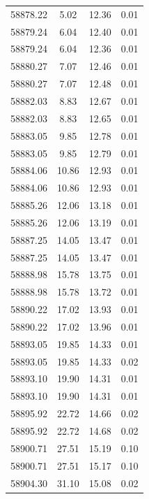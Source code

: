 \begin{longtable}{|c|c|c|c|}
 58878.22 &    5.02 &       12.36 &          0.01 \\
 58879.24 &    6.04 &       12.40 &          0.01 \\
 58879.24 &    6.04 &       12.36 &          0.01 \\
 58880.27 &    7.07 &       12.46 &          0.01 \\
 58880.27 &    7.07 &       12.48 &          0.01 \\
 58882.03 &    8.83 &       12.67 &          0.01 \\
 58882.03 &    8.83 &       12.65 &          0.01 \\
 58883.05 &    9.85 &       12.78 &          0.01 \\
 58883.05 &    9.85 &       12.79 &          0.01 \\
 58884.06 &   10.86 &       12.93 &          0.01 \\
 58884.06 &   10.86 &       12.93 &          0.01 \\
 58885.26 &   12.06 &       13.18 &          0.01 \\
 58885.26 &   12.06 &       13.19 &          0.01 \\
 58887.25 &   14.05 &       13.47 &          0.01 \\
 58887.25 &   14.05 &       13.47 &          0.01 \\
 58888.98 &   15.78 &       13.75 &          0.01 \\
 58888.98 &   15.78 &       13.72 &          0.01 \\
 58890.22 &   17.02 &       13.93 &          0.01 \\
 58890.22 &   17.02 &       13.96 &          0.01 \\
 58893.05 &   19.85 &       14.33 &          0.01 \\
 58893.05 &   19.85 &       14.33 &          0.02 \\
 58893.10 &   19.90 &       14.31 &          0.01 \\
 58893.10 &   19.90 &       14.31 &          0.01 \\
 58895.92 &   22.72 &       14.66 &          0.02 \\
 58895.92 &   22.72 &       14.68 &          0.02 \\
 58900.71 &   27.51 &       15.19 &          0.10 \\
 58900.71 &   27.51 &       15.17 &          0.10 \\
 58904.30 &   31.10 &       15.08 &          0.02 \\

\end{longtable}
